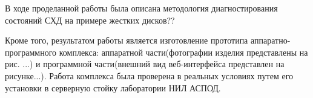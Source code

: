 \conclusion

В ходе проделанной работы была описана методология диагностирования состояний СХД на примере жестких дисков??

Кроме того, результатом работы является изготовление прототипа аппаратно-программного комплекса: аппаратной части(фотографии изделия представлены на рис. ...) и программной части(внешний вид веб-интерфейса представлен на рисунке...). Работа комплекса была проверена в реальных условиях путем его установки в серверную стойку лаборатории НИЛ АСПОД. 